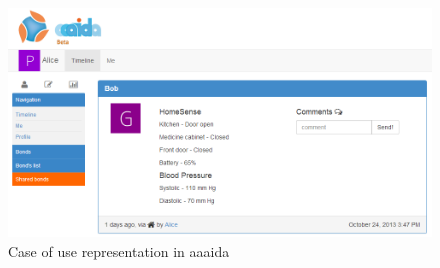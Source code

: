 \begin{figure}[H]\begin{center}
 \centering
  \captionsetup{justification=centering}
  \includegraphics[width=1\textwidth]{pictures/proposal/aaaida-use-case}
  \caption{Case of use representation in aaaida \label{fig:network-architecture}}
\end{center}\end{figure}



